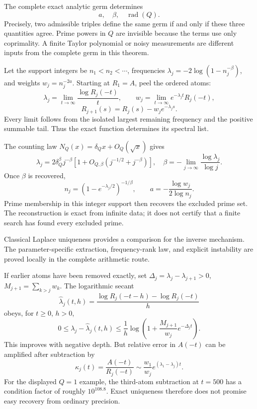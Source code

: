 The complete exact analytic germ determines
\[
\boxed{a,\quad\beta,\quad\operatorname{rad}(Q).}
\]
Precisely, two admissible triples define the same germ if and only if these
three quantities agree. Prime powers in $Q$ are invisible because the terms
use only coprimality. A finite Taylor polynomial or noisy measurements are
different inputs from the complete germ in this theorem.

Let the support integers be $n_1<n_2<\cdots$, frequencies
$\lambda_j=-2\log(1-n_j^{-\beta})$, and weights $w_j=n_j^{-2a}$.
Starting at $R_1=A$, peel the ordered atoms:
\[
\lambda_j=\lim_{t\to\infty}\frac{\log R_j(-t)}t,\qquad
w_j=\lim_{t\to\infty}e^{-\lambda_jt}R_j(-t),
\]
\[
R_{j+1}(s)=R_j(s)-w_je^{-\lambda_js}.
\]
Every limit follows from the isolated largest remaining frequency and the
positive summable tail. Thus the exact function determines its spectral list.

The counting law $N_Q(x)=\delta_Qx+O_Q(\sqrt x)$ gives
\[
\lambda_j=2\delta_Q^\beta j^{-\beta}
[1+O_{Q,\beta}(j^{-1/2}+j^{-\beta})],
\quad
\beta=-\lim_{j\to\infty}\frac{\log\lambda_j}{\log j}.
\]
Once $\beta$ is recovered,
\[
n_j=(1-e^{-\lambda_j/2})^{-1/\beta},\qquad
a=-\frac{\log w_j}{2\log n_j}.
\]
Prime membership in this integer support then recovers the excluded prime
set. The reconstruction is exact from infinite data; it does not certify
that a finite search has found every excluded prime.

Classical Laplace uniqueness provides a comparison for the inverse mechanism.
The parameter-specific extraction, frequency-rank law, and explicit instability
are proved locally in the complete arithmetic route.

If earlier atoms have been removed exactly, set
$\Delta_j=\lambda_j-\lambda_{j+1}>0$, $M_{j+1}=\sum_{k>j}w_k$.
The logarithmic secant
\[
\widehat\lambda_j(t,h)=\frac{\log R_j(-t-h)-\log R_j(-t)}h
\]
obeys, for $t\ge0$, $h>0$,
\[
0\le\lambda_j-\widehat\lambda_j(t,h)
\le\frac1h\log\left(1+\frac{M_{j+1}}{w_j}e^{-\Delta_jt}\right).
\]
This improves with negative depth. But relative error in $A(-t)$ can be
amplified after subtraction by
\[
\kappa_j(t)=\frac{A(-t)}{R_j(-t)}
\sim\frac{w_1}{w_j}e^{(\lambda_1-\lambda_j)t}.
\]
For the displayed $Q=1$ example, the third-atom subtraction at $t=500$
has a condition factor of roughly $10^{108.8}$. Exact uniqueness therefore
does not promise easy recovery from ordinary precision.

